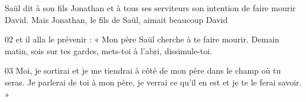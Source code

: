 Saül dit à son fils Jonathan et à tous ses serviteurs son intention de faire mourir David. Mais Jonathan, le fils de Saül, aimait beaucoup David

02 et il alla le prévenir : « Mon père Saül cherche à te faire mourir. Demain matin, sois sur tes gardes, mets-toi à l’abri, dissimule-toi.

03 Moi, je sortirai et je me tiendrai à côté de mon père dans le champ où tu seras. Je parlerai de toi à mon père, je verrai ce qu’il en est et je te le ferai savoir. »